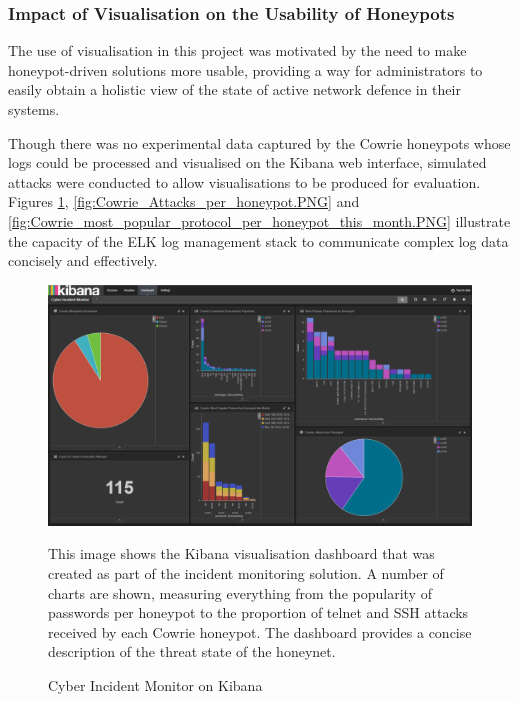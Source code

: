 \subsubsection{Impact of Visualisation on the Usability of Honeypots}
The use of visualisation in this project was motivated by the need to make honeypot-driven solutions more usable, providing a way for administrators to easily obtain a holistic view of the state of active network defence in their systems.

Though there was no experimental data captured by the Cowrie honeypots whose logs could be processed and visualised on the Kibana web interface, simulated attacks were conducted to allow visualisations to be produced for evaluation. Figures \ref{fig:Some_Cowrie_visualisations_on_the_Kibana_dashboard_.PNG}, \ref{fig:Cowrie_Attacks_per_honeypot.PNG} and \ref{fig:Cowrie_most_popular_protocol_per_honeypot_this_month.PNG} illustrate the capacity of the ELK log management stack to communicate complex log data concisely and effectively.

\begin{figure}[ht]
      \centering
      \includegraphics[width=160mm, scale=1]{Images/Some_Cowrie_visualisations_on_the_Kibana_dashboard_.PNG}
      \caption{Cyber Incident Monitor on Kibana} 
      \medskip
      \small
		This image shows the Kibana visualisation dashboard that was created as part of the incident monitoring solution. A number of charts are shown, measuring everything from the popularity of passwords per honeypot to the proportion of telnet and SSH attacks received by each Cowrie honeypot. The dashboard provides a concise description of the threat state of the honeynet.
\label{fig:Some_Cowrie_visualisations_on_the_Kibana_dashboard_.PNG}
\end{figure}

